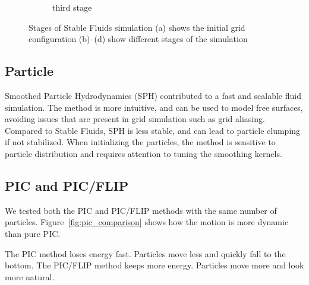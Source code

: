 \begin{figure}[h]
\begin{subfigure}[b]{0.2\textwidth}
        \caption{third stage}
    \end{subfigure}
    \caption{Stages of Stable Fluids simulation 
    (a) shows the initial grid configuration
    (b)–(d) show different stages of the simulation}
    \label{fig:grid}
\end{figure}

\subsection{Particle}
Smoothed Particle Hydrodynamics (SPH) contributed to a fast and scalable fluid simulation. The method is more intuitive, and can be used to model free surfaces, avoiding issues that are present in grid simulation such as grid aliasing.
Compared to Stable Fluids, SPH is less stable, and can lead to particle clumping if not stabilized. When initializing the particles, the method is sensitive to particle distribution and requires attention to tuning the smoothing kernels.

\subsection{PIC and PIC/FLIP}

We tested both the PIC and PIC/FLIP methods with the same number of particles. Figure~\ref{fig:pic_comparison} shows how the motion is more dynamic than pure PIC.

The PIC method loses energy fast. Particles move less and quickly fall to the bottom.
The PIC/FLIP method keeps more energy. Particles move more and look more natural.


